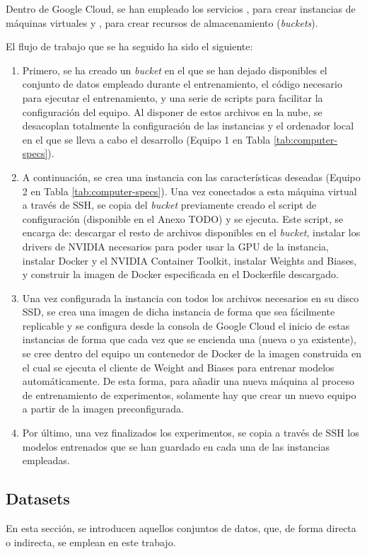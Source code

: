 Dentro de Google Cloud, se han empleado los servicios , para crear instancias de máquinas virtuales y , para crear recursos de almacenamiento (\textit{buckets}).

El flujo de trabajo que se ha seguido ha sido el siguiente:

\begin{enumerate}
\item Primero, se ha creado un \textit{bucket} en el que se han dejado disponibles el conjunto de datos empleado durante el entrenamiento, el código necesario para ejecutar el entrenamiento, y una serie de scripts para facilitar la configuración del equipo. Al disponer de estos archivos en la nube, se desacoplan totalmente la configuración de las instancias y el ordenador local en el que se lleva a cabo el desarrollo (Equipo 1 en Tabla \ref{tab:computer-specs}).
\item A continuación, se crea una instancia con las características deseadas (Equipo 2 en Tabla \ref{tab:computer-specs}). Una vez conectados a esta máquina virtual a través de SSH, se copia del \textit{bucket} previamente creado el script de configuración (disponible en el Anexo TODO) y se ejecuta. Este script, se encarga de: descargar el resto de archivos disponibles en el \textit{bucket}, instalar los drivers de NVIDIA necesarios para poder usar la GPU de la instancia, instalar Docker y el NVIDIA Container Toolkit, instalar Weights and Biases, y construir la imagen de Docker especificada en el Dockerfile descargado.
\item Una vez configurada la instancia con todos los archivos necesarios en su disco SSD, se crea una imagen de dicha instancia de forma que sea fácilmente replicable y se configura desde la consola de Google Cloud el inicio de estas instancias de forma que cada vez que se encienda una (nueva o ya existente), se cree dentro del equipo un contenedor de Docker de la imagen construida en el cual se ejecuta el cliente de Weight and Biases para entrenar modelos automáticamente. De esta forma, para añadir una nueva máquina al proceso de entrenamiento de experimentos, solamente hay que crear un nuevo equipo a partir de la imagen preconfigurada.
\item Por último, una vez finalizados los experimentos, se copia a través de SSH los modelos entrenados que se han guardado en cada una de las instancias empleadas.
\end{enumerate}

\subsection{Datasets}
En esta sección, se introducen aquellos conjuntos de datos, que, de forma directa o indirecta, se emplean en este trabajo.

